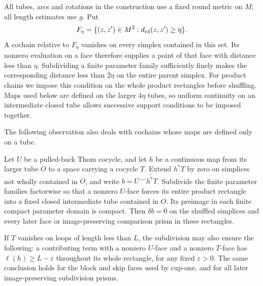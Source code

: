 All tubes, arcs and rotations in the construction use a fixed round
metric on $M$; all length estimates use $g$.  Put
\[
 F_\eta=\{(z,z')\in M^2:d_{\rm rd}(z,z')\ge\eta\}.
\]
A cochain relative to $F_\eta$ vanishes on every simplex contained
in this set.  Its nonzero evaluation on a face therefore supplies a
point of that face with distance less than $\eta$.  Subdividing a
finite parameter family sufficiently finely makes the corresponding
distance less than $2\eta$ on the entire parent simplex.  For product
chains we impose this condition on the whole product rectangles
before shuffling.  Maps used below are defined on the larger
$4\eta$ tubes, so uniform continuity on an intermediate closed tube
allows successive support conditions to be imposed together.

The following observation also deals with cochains whose maps are
defined only on a tube.

\begin{lemma}\label{lem:cj-small-chains}
Let $U$ be a pulled-back Thom cocycle, and let $h$ be a continuous
map from its larger tube $O$ to a space carrying a cocycle $T$.
Extend $h^*T$ by zero on simplices not wholly contained in $O$, and
write $b=U\smile\widetilde{h^*T}$.  Subdivide the finite parameter
families factorwise so that a nonzero $U$-face forces its entire
product rectangle into a fixed closed intermediate tube contained
in $O$.  Its preimage in each finite compact parameter domain is
compact.  Then $\delta b=0$ on the shuffled simplices and every
later face or image-preserving comparison prism in these rectangles.

If $T$ vanishes on loops of length less than $L$, the subdivision
may also ensure the following: a contributing term with a nonzero
$U$-face and a nonzero $T$-face has $\ell(h)\ge L-\varepsilon$
throughout its whole rectangle, for any fixed $\varepsilon>0$.
The same conclusion holds for the block and skip faces used by
cup-one, and for all later image-preserving subdivision prisms.
\end{lemma}

